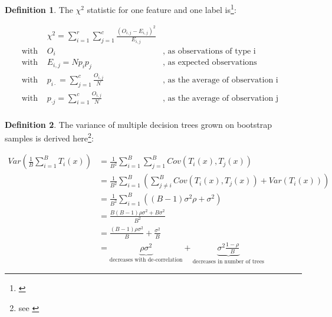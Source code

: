 \documentclass[12pt, a4paper]{scrartcl}
\theoremstyle{definition}
\newtheorem{definition}{Definition}[subsection]
\begin{document}
\begin{definition}The $\chi^2$ statistic for one feature and one label is\footnote{\cite{manning2008introduction}}:
\label{def:chi}

\bigskip

\begin{align*}
&\chi^2 = \sum^r_{i = 1}\sum^c_{j = 1}\frac{(O_{i,j}-E_{i,j})^2}{E_{i,j}} & &\\
\text{with } &O_i  &\text{, as observations of type i}\\
\text{with } &E_{i,j} = Np_ip_j &\text{, as expected observations}\\
\text{with } &p_{i\cdot} = \sum^c_{j = 1}\frac{O_{i,j}}{N} &\text{, as the average of observation i}\\
\text{with } &p_{\cdot j} = \sum^c_{i = 1}\frac{O_{i,j}}{N} &\text{, as the average of observation j}\\
\end{align*}
\end{definition}\vspace{6cm}

\begin{definition}
The variance of multiple decision trees grown on bootstrap samples is derived
here\footnote{see \cite{friedman2009elements}}:

\begin{align*}
Var(\frac{1}{B}\sum^B_{i=1}T_i(x)) &= \frac{1}{B^2}\sum^B_{i=1}\sum^B_{j=1}Cov(T_i(x), T_j(x))\\
&= \frac{1}{B^2}\sum^B_{i=1}(\sum^B_{j\neq i}Cov(T_i(x), T_j(x)) + Var(T_i(x)))\\
&= \frac{1}{B^2}\sum^B_{i=1} ((B-1)\sigma^2\rho + \sigma^2)\\
&= \frac{B(B-1)\rho\sigma^2 + B\sigma^2}{B^2}\\
&= \frac{(B-1)\rho\sigma^2}{B} + \frac{\sigma^2}{B}\\
&= \underbrace{\rho\sigma^2}_{\text{decreases with de-correlation}} + \underbrace{\sigma^2 \frac{1-\rho}{B}}_{\text{decreases in number of trees}}
\end{align*}
\label{def:bootstrap}
\end{definition}\vspace{2cm}
\end{document}
